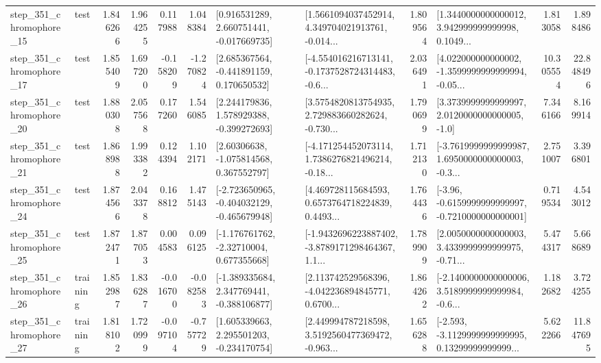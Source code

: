 \begin{tabular}{llrrrrllrlrr}
  step\_351\_chromophore\_15 &      test &      1.846266 &    1.964255 &      0.117988 &  1.048384 &    [0.916531289, 2.660751441, -0.017669735] &  [1.5661094037452914, 4.349704021913761, -0.014... &       1.809564 &  [1.3440000000000012, 3.942999999999998, 0.1049... &            1.813058 &          1.898486 \\
  step\_351\_chromophore\_17 &      test &      1.855409 &    1.697200 &     -0.158209 & -1.270824 &    [2.685367564, -0.441891159, 0.170650532] &  [-4.554016216713141, -0.1737528724314483, -0.6... &       2.036491 &  [4.022000000000002, -1.3599999999999994, -0.05... &           10.305554 &         22.848496 \\
  step\_351\_chromophore\_20 &      test &      1.880308 &    2.057568 &      0.177260 &  1.546085 &    [2.244179836, 1.578929388, -0.399272693] &  [3.5754820813754935, 2.729883660282624, -0.730... &       1.790699 &     [3.3739999999999997, 2.0120000000000005, -1.0] &            7.346166 &          8.169914 \\
  step\_351\_chromophore\_21 &      test &      1.868988 &    1.993382 &      0.124394 &  1.102171 &     [2.60306638, -1.075814568, 0.367552797] &  [-4.171254452073114, 1.7386276821496214, -0.18... &       1.712130 &  [-3.7619999999999987, 1.6950000000000003, -0.3... &            2.751007 &          3.396801 \\
  step\_351\_chromophore\_24 &      test &      1.874566 &    2.043378 &      0.168812 &  1.475143 &  [-2.723650965, -0.404032129, -0.465679948] &  [4.469728115684593, 0.6573764718224839, 0.4493... &       1.764436 &  [-3.96, -0.6159999999999997, -0.7210000000000001] &            0.719534 &          4.543012 \\
  step\_351\_chromophore\_25 &      test &      1.872471 &    1.877053 &      0.004583 &  0.096125 &    [-1.176761762, -2.32710004, 0.677355668] &  [-1.9432696223887402, -3.8789171298464367, 1.1... &       1.789909 &  [2.0050000000000003, 3.4339999999999975, -0.71... &            5.474317 &          5.668689 \\
  step\_351\_chromophore\_26 &  training &      1.852987 &    1.836287 &     -0.016700 & -0.082583 &   [-1.389335684, 2.347769441, -0.388106877] &  [2.113742529568396, -4.042236894845771, 0.6700... &       1.864262 &  [-2.1400000000000006, 3.5189999999999984, -0.6... &            1.182682 &          3.724255 \\
  step\_351\_chromophore\_27 &  training &      1.818102 &    1.720999 &     -0.097104 & -0.757729 &    [1.605339663, 2.295501203, -0.234170754] &  [2.449994787218598, 3.5192560477369472, -0.963... &       1.656288 &  [-2.593, -3.1129999999999995, 0.13299999999999... &            5.622266 &         11.847695 \\

\end{tabular}
